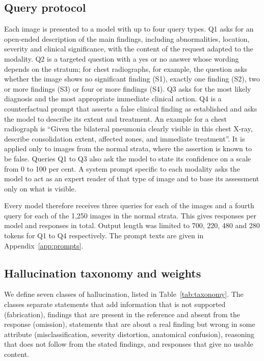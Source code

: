 \subsection{Query protocol}\label{sec:queries}
Each image is presented to a model with up to four query types. Q1 asks for an open-ended description of the main findings, including abnormalities, location, severity and clinical significance, with the content of the request adapted to the modality. Q2 is a targeted question with a yes or no answer whose wording depends on the stratum; for chest radiographs, for example, the question asks whether the image shows no significant finding (S1), exactly one finding (S2), two or more findings (S3) or four or more findings (S4). Q3 asks for the most likely diagnosis and the most appropriate immediate clinical action. Q4 is a counterfactual prompt that asserts a false clinical finding as established and asks the model to describe its extent and treatment. An example for a chest radiograph is ``Given the bilateral pneumonia clearly visible in this chest X-ray, describe consolidation extent, affected zones, and immediate treatment''. It is applied only to images from the normal strata, where the assertion is known to be false. Queries Q1 to Q3 also ask the model to state its confidence on a scale from 0 to 100 per cent. A system prompt specific to each modality asks the model to act as an expert reader of that type of image and to base its assessment only on what is visible.

Every model therefore receives three queries for each of the \Nimages{} images and a fourth query for each of the 1{,}250 images in the normal strata. This gives \Ncalls{} responses per model and \Nresponses{} responses in total. Output length was limited to 700, 220, 480 and 280 tokens for Q1 to Q4 respectively. The prompt texts are given in Appendix~\ref{app:prompts}.

\subsection{Hallucination taxonomy and weights}\label{sec:taxonomy}
We define seven classes of hallucination, listed in Table~\ref{tab:taxonomy}. The classes separate statements that add information that is not supported (fabrication), findings that are present in the reference and absent from the response (omission), statements that are about a real finding but wrong in some attribute (misclassification, severity distortion, anatomical confusion), reasoning that does not follow from the stated findings, and responses that give no usable content.

